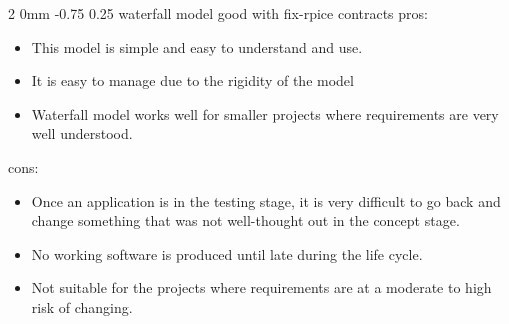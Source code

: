 \documentclass[a4paper,11pt]{article}
\makeatletter
\renewcommand{\subsection}{\@startsection
   {subsection}%
   {2}%
   {0mm}%
   {-0.75\baselineskip}%
   {0.25\baselineskip}%
   {\rmfamily\normalfont\slshape\normalsize}}%
\makeatother
\begin{document}
\subsection{waterfall model}
good with fix-rpice contracts
pros:
\begin{itemize}
\item This model is simple and easy to understand and use.
\item It is easy to manage due to the rigidity of the model 
\item Waterfall model works well for smaller projects where requirements are very well understood.
\end{itemize}
cons:
\begin{itemize}
\item Once an application is in the testing stage, it is very difficult to go back and change something that was not well-thought out in the concept stage.
\item No working software is produced until late during the life cycle.
\item Not suitable for the projects where requirements are at a moderate to high risk of changing.
\end{itemize}
\end{document}

